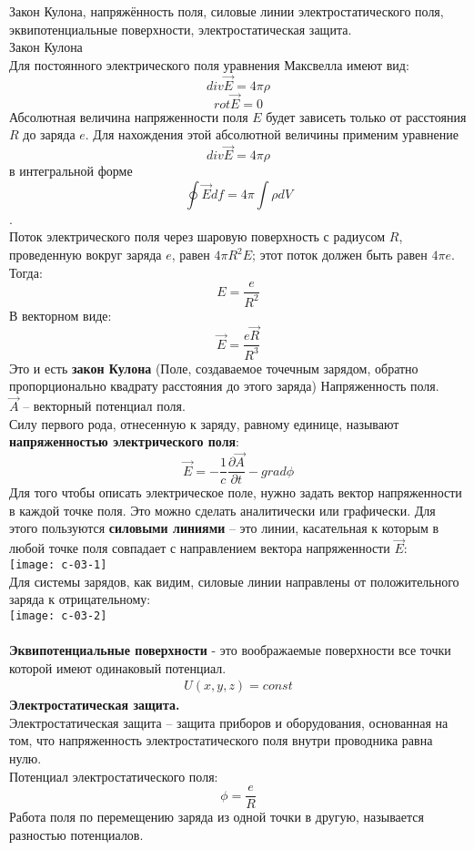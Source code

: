 \documentclass[__main__.tex]{subfiles}
\begin{document}
	
	Закон Кулона, напряжённость поля, силовые линии электростатического поля, эквипотенциальные поверхности, электростатическая защита.\\ 
	
	Закон Кулона\\
	Для постоянного электрического поля уравнения Максвелла имеют вид:
	$$ div \vec{E} = 4 \pi \rho$$
	$$ rot \vec{E} = 0$$
	Абсолютная величина напряженности поля $E$ будет зависеть только от расстояния $R$ до заряда $e$. Для нахождения этой абсолютной величины применим уравнение $$ div \vec{E} = 4 \pi \rho$$ в интегральной форме $$\oint \vec{E} df = 4 \pi \int \rho dV$$.\\
	Поток электрического поля через шаровую поверхность с радиусом $R$, проведенную вокруг заряда $e$, равен $4\pi R^2 E$; этот поток должен быть равен $4\pi e$. Тогда:\\
	$$E = \frac{e}{R^2}$$
	В векторном виде:
	$$\vec{E} = \frac{e \vec{R}}{R^3}$$
	Это и есть \textbf{закон Кулона} (Поле, создаваемое точечным зарядом, обратно пропорционально квадрату расстояния до этого заряда)
	Напряженность поля.\\
	$\vec{A}$ -- векторный потенциал поля.\\
	Силу первого рода, отнесенную к заряду, равному единице, называют \textbf{напряженностью электрического поля}:\\
	$$\vec{E} = -\frac{1}{c}\frac{\partial \vec{A}}{\partial t}-grad \phi$$
	Для того чтобы описать электрическое поле, нужно задать вектор напряженности в каждой точке поля. Это можно сделать аналитически или графически. Для этого пользуются \textbf{силовыми линиями} – это линии, касательная к которым в любой точке поля совпадает с направлением вектора напряженности $\vec{E}$:\\
	\texttt{[image: c-03-1]}\\
	Для системы зарядов, как видим, силовые линии направлены от положительного заряда к отрицательному:\\
	\texttt{[image: c-03-2]}\\\\
	\textbf{Эквипотенциальные поверхности} - это воображаемые поверхности все точки которой имеют одинаковый потенциал.
	\begin{gather*}
		U(x,y,z) = const
	\end{gather*}
	\textbf{Электростатическая защита.}\\
	Электростатическая защита – защита приборов и оборудования, основанная на том, что напряженность электростатического поля внутри проводника равна нулю.\\
	Потенциал электростатического поля:
	$$\phi = \frac{e}{R}$$
	Работа поля по перемещению заряда из одной точки в другую, называется разностью потенциалов.\\
	
\end{document}
